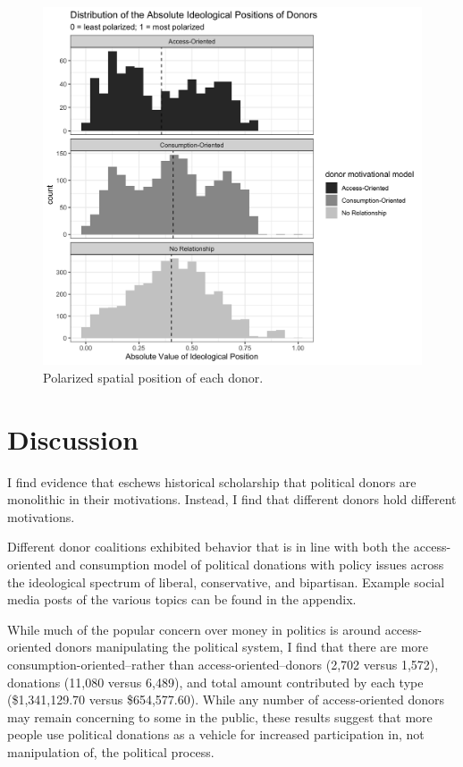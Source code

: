\documentclass[12pt,]{article}
\begin{document}
\begin{figure}
\centering
\includegraphics{../tables_and_figures/fig_node_position_absolute.jpg}
\caption{Polarized spatial position of each donor.}
\end{figure}

\hypertarget{discussion}{%
\section{Discussion}\label{discussion}}

I find evidence that eschews historical scholarship that political
donors are monolithic in their motivations. Instead, I find that
different donors hold different motivations.

Different donor coalitions exhibited behavior that is in line with both
the access-oriented and consumption model of political donations with
policy issues across the ideological spectrum of liberal, conservative,
and bipartisan. Example social media posts of the various topics can be
found in the appendix.

While much of the popular concern over money in politics is around
access-oriented donors manipulating the political system, I find that
there are more consumption-oriented--rather than access-oriented--donors
(2,702 versus 1,572), donations (11,080 versus 6,489), and total amount
contributed by each type (\$1,341,129.70 versus \$654,577.60). While any
number of access-oriented donors may remain concerning to some in the
public, these results suggest that more people use political donations
as a vehicle for increased participation in, not manipulation of, the
political process.
\end{document}
